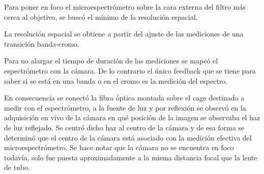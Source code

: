 \hspace{0.5cm}Para poner en foco el microespectrómetro sobre la cara externa del filtro más cerca al objetivo, se buscó el mínimo de la resolución espacial.

La resolución espacial se obtiene a partir del ajuste de las mediciones de una transición banda-cromo.

Para no alargar el tiempo de duración de las mediciones se mapeó el espectrómetro con la cámara. De lo contrario el único feedback que se tiene para saber si se está en una banda o en el cromo es la medición del espectro.

En consecuencia se conectó la fibra óptica montada sobre el cage destinado a medir con el espectrómetro, a la fuente de luz y por reflexión se observó en la adquisición en vivo de la cámara en qué posición de la imagen se observaba el haz de luz reflejado. Se centró dicho haz al centro de la cámara y de esa forma se determinó que el centro de la cámara está asociado con la medición efectiva del microespectrómetro. Se hace notar que la cámara no se encuentra en foco todavía, solo fue puesta aproximadamente a la misma distancia focal que la lente de tubo.

